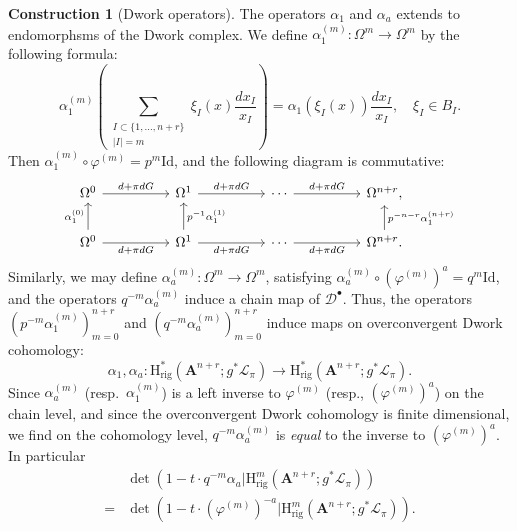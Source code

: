 \documentclass{amsart}
\numberwithin{equation}{section}
\theoremstyle{plain}
\theoremstyle{definition}
\newtheorem{construction}[equation]{Construction}
\renewcommand{\mathbb}{\mathbf}
\begin{document}
\begin{construction}[Dwork operators]
The operators \(\alpha_{1}\) and \(\alpha_{a}\) extends to endomorphsms of
the Dwork complex.  We define
\(\alpha_{1}^{(m)} \colon \Omega^{m} \to \Omega^{m}\) by the following
formula:
\begin{equation*}
\alpha_{1}^{(m)}
\left(\sum_{\substack{I\subset\{1,\ldots,n+r\}\\|I|=m}}\xi_I(x) \frac{dx_I}{x_{I}}\right)
= \alpha_{1}(\xi_I(x)) \frac{dx_I}{x_I}, \quad \xi_I \in B_{I}.
\end{equation*}
Then \(\alpha_{1}^{(m)} \circ \varphi^{(m)} = p^{m} \mathrm{Id}\), and
the following diagram is commutative:
\begin{equation*}
\begin{tikzcd}
\Omega^{0} \ar[rr,"d + \pi dG"] & & \Omega^{1} \ar[rr,"d + \pi dG"] & & \cdots \ar[rr,"d + \pi dG"] & & \Omega^{n+r},\\
\Omega^{0} \ar[rr,swap,"d + \pi dG"] \ar[u,"\alpha_{1}^{(0)}"] & & \Omega^{1} \ar[rr,swap,"d + \pi dG"] \ar[u,swap,"p^{-1}\alpha_{1}^{(1)}"]& & \cdots \ar[rr,swap,"d + \pi dG"] & & \Omega^{n+r} \ar[u,"p^{-n-r}\alpha_{1}^{(n+r)}",swap].
\end{tikzcd}
\end{equation*}
Similarly, we may define
\(\alpha_{a}^{(m)}\colon\Omega^{m}\to\Omega^{m}\), satisfying
\(\alpha_{a}^{(m)}\circ(\varphi^{(m)})^{a}=q^{m}\mathrm{Id}\), and the
operators \(q^{-m}\alpha_{a}^{(m)}\) induce a chain map of
\(\mathcal{D}^{\bullet}\).  Thus, the operators
\((p^{-m}\alpha_{1}^{(m)})_{m=0}^{n+r}\) and
\((q^{-m}\alpha_{a}^{(m)})_{m=0}^{n+r}\) induce maps on overconvergent
Dwork cohomology:
\begin{equation*}
\alpha_{1}, \alpha_{a}\colon \mathrm{H}^{\ast}_{\mathrm{rig}}(\mathbb{A}^{n+r};g^{\ast}\mathcal{L}_{\pi})
\to \mathrm{H}^{\ast}_{\mathrm{rig}}(\mathbb{A}^{n+r};g^{\ast}\mathcal{L}_{\pi}).
\end{equation*}
Since \(\alpha_{a}^{(m)}\) (resp.~\(\alpha_{1}^{(m)}\)) is a left inverse
to \(\varphi^{(m)}\) (resp., \((\varphi^{(m)})^{a}\)) on the chain
level, and since the overconvergent Dwork cohomology is finite
dimensional, we find on the cohomology level, \(q^{-m}\alpha_{a}^{(m)}\) is
\emph{equal} to the inverse to \((\varphi^{(m)})^{a}\).  In particular
\begin{align}\label{eq:dwork-vs-frob}
&\det(1 - t\cdot q^{-m}\alpha_{a} | \mathrm{H}^{m}_{\mathrm{rig}}(\mathbb{A}^{n+r};g^{\ast}\mathcal{L}_{\pi})) \\
=& \det(1 - t\cdot(\varphi^{(m)})^{-a} | \mathrm{H}^{m}_{\mathrm{rig}}(\mathbb{A}^{n+r};g^{\ast}\mathcal{L}_{\pi})).\nonumber
\end{align}
\end{construction}
\end{document}
